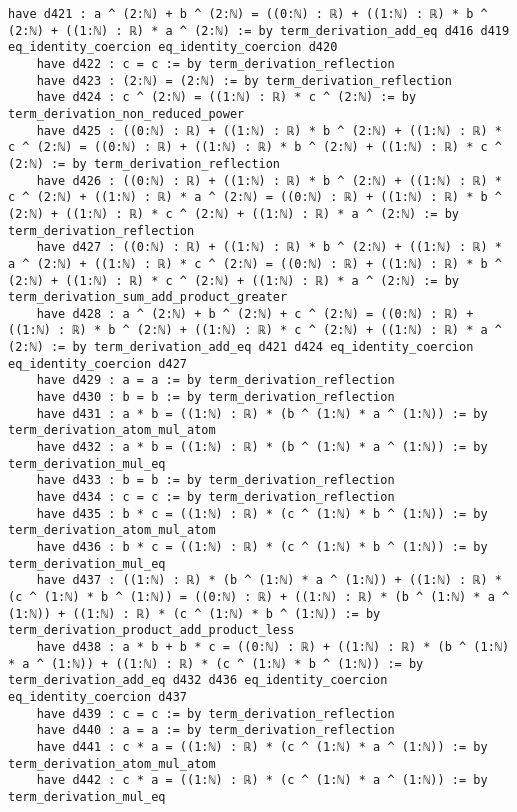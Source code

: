 \documentclass{article}
\begin{document}
\begin{tcolorbox}[colback=white!10, width=\linewidth]
\begin{lstlisting}[language=Lean4]
    have d421 : a ^ (2:ℕ) + b ^ (2:ℕ) = ((0:ℕ) : ℝ) + ((1:ℕ) : ℝ) * b ^ (2:ℕ) + ((1:ℕ) : ℝ) * a ^ (2:ℕ) := by term_derivation_add_eq d416 d419 eq_identity_coercion eq_identity_coercion d420
    have d422 : c = c := by term_derivation_reflection
    have d423 : (2:ℕ) = (2:ℕ) := by term_derivation_reflection
    have d424 : c ^ (2:ℕ) = ((1:ℕ) : ℝ) * c ^ (2:ℕ) := by term_derivation_non_reduced_power
    have d425 : ((0:ℕ) : ℝ) + ((1:ℕ) : ℝ) * b ^ (2:ℕ) + ((1:ℕ) : ℝ) * c ^ (2:ℕ) = ((0:ℕ) : ℝ) + ((1:ℕ) : ℝ) * b ^ (2:ℕ) + ((1:ℕ) : ℝ) * c ^ (2:ℕ) := by term_derivation_reflection
    have d426 : ((0:ℕ) : ℝ) + ((1:ℕ) : ℝ) * b ^ (2:ℕ) + ((1:ℕ) : ℝ) * c ^ (2:ℕ) + ((1:ℕ) : ℝ) * a ^ (2:ℕ) = ((0:ℕ) : ℝ) + ((1:ℕ) : ℝ) * b ^ (2:ℕ) + ((1:ℕ) : ℝ) * c ^ (2:ℕ) + ((1:ℕ) : ℝ) * a ^ (2:ℕ) := by term_derivation_reflection
    have d427 : ((0:ℕ) : ℝ) + ((1:ℕ) : ℝ) * b ^ (2:ℕ) + ((1:ℕ) : ℝ) * a ^ (2:ℕ) + ((1:ℕ) : ℝ) * c ^ (2:ℕ) = ((0:ℕ) : ℝ) + ((1:ℕ) : ℝ) * b ^ (2:ℕ) + ((1:ℕ) : ℝ) * c ^ (2:ℕ) + ((1:ℕ) : ℝ) * a ^ (2:ℕ) := by term_derivation_sum_add_product_greater
    have d428 : a ^ (2:ℕ) + b ^ (2:ℕ) + c ^ (2:ℕ) = ((0:ℕ) : ℝ) + ((1:ℕ) : ℝ) * b ^ (2:ℕ) + ((1:ℕ) : ℝ) * c ^ (2:ℕ) + ((1:ℕ) : ℝ) * a ^ (2:ℕ) := by term_derivation_add_eq d421 d424 eq_identity_coercion eq_identity_coercion d427
    have d429 : a = a := by term_derivation_reflection
    have d430 : b = b := by term_derivation_reflection
    have d431 : a * b = ((1:ℕ) : ℝ) * (b ^ (1:ℕ) * a ^ (1:ℕ)) := by term_derivation_atom_mul_atom
    have d432 : a * b = ((1:ℕ) : ℝ) * (b ^ (1:ℕ) * a ^ (1:ℕ)) := by term_derivation_mul_eq
    have d433 : b = b := by term_derivation_reflection
    have d434 : c = c := by term_derivation_reflection
    have d435 : b * c = ((1:ℕ) : ℝ) * (c ^ (1:ℕ) * b ^ (1:ℕ)) := by term_derivation_atom_mul_atom
    have d436 : b * c = ((1:ℕ) : ℝ) * (c ^ (1:ℕ) * b ^ (1:ℕ)) := by term_derivation_mul_eq
    have d437 : ((1:ℕ) : ℝ) * (b ^ (1:ℕ) * a ^ (1:ℕ)) + ((1:ℕ) : ℝ) * (c ^ (1:ℕ) * b ^ (1:ℕ)) = ((0:ℕ) : ℝ) + ((1:ℕ) : ℝ) * (b ^ (1:ℕ) * a ^ (1:ℕ)) + ((1:ℕ) : ℝ) * (c ^ (1:ℕ) * b ^ (1:ℕ)) := by term_derivation_product_add_product_less
    have d438 : a * b + b * c = ((0:ℕ) : ℝ) + ((1:ℕ) : ℝ) * (b ^ (1:ℕ) * a ^ (1:ℕ)) + ((1:ℕ) : ℝ) * (c ^ (1:ℕ) * b ^ (1:ℕ)) := by term_derivation_add_eq d432 d436 eq_identity_coercion eq_identity_coercion d437
    have d439 : c = c := by term_derivation_reflection
    have d440 : a = a := by term_derivation_reflection
    have d441 : c * a = ((1:ℕ) : ℝ) * (c ^ (1:ℕ) * a ^ (1:ℕ)) := by term_derivation_atom_mul_atom
    have d442 : c * a = ((1:ℕ) : ℝ) * (c ^ (1:ℕ) * a ^ (1:ℕ)) := by term_derivation_mul_eq

\end{lstlisting}
\end{tcolorbox}
\end{document}
